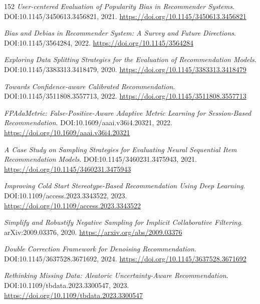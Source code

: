\documentclass[11pt,a4paper]{article}
\begin{document}
\begin{thebibliography}{152}
\newblock \emph{User-centered Evaluation of Popularity Bias in Recommender Systems}.
\newblock DOI:10.1145/3450613.3456821, 2021.
\newblock \url{https://doi.org/10.1145/3450613.3456821}

\newblock \emph{Bias and Debias in Recommender System: A Survey and Future Directions}.
\newblock DOI:10.1145/3564284, 2022.
\newblock \url{https://doi.org/10.1145/3564284}

\newblock \emph{Exploring Data Splitting Strategies for the Evaluation of Recommendation Models}.
\newblock DOI:10.1145/3383313.3418479, 2020.
\newblock \url{https://doi.org/10.1145/3383313.3418479}

\newblock \emph{Towards Confidence-aware Calibrated Recommendation}.
\newblock DOI:10.1145/3511808.3557713, 2022.
\newblock \url{https://doi.org/10.1145/3511808.3557713}

\newblock \emph{FPAdaMetric: False-Positive-Aware Adaptive Metric Learning for Session-Based Recommendation}.
\newblock DOI:10.1609/aaai.v36i4.20321, 2022.
\newblock \url{https://doi.org/10.1609/aaai.v36i4.20321}

\newblock \emph{A Case Study on Sampling Strategies for Evaluating Neural Sequential Item Recommendation Models}.
\newblock DOI:10.1145/3460231.3475943, 2021.
\newblock \url{https://doi.org/10.1145/3460231.3475943}

\newblock \emph{Improving Cold Start Stereotype-Based Recommendation Using Deep Learning}.
\newblock DOI:10.1109/access.2023.3343522, 2023.
\newblock \url{https://doi.org/10.1109/access.2023.3343522}

\newblock \emph{Simplify and Robustify Negative Sampling for Implicit Collaborative Filtering}.
\newblock arXiv:2009.03376, 2020.
\newblock \url{https://arxiv.org/abs/2009.03376}

\newblock \emph{Double Correction Framework for Denoising Recommendation}.
\newblock DOI:10.1145/3637528.3671692, 2024.
\newblock \url{https://doi.org/10.1145/3637528.3671692}

\newblock \emph{Rethinking Missing Data: Aleatoric Uncertainty-Aware Recommendation}.
\newblock DOI:10.1109/tbdata.2023.3300547, 2023.
\newblock \url{https://doi.org/10.1109/tbdata.2023.3300547}


\end{thebibliography}
\end{document}
